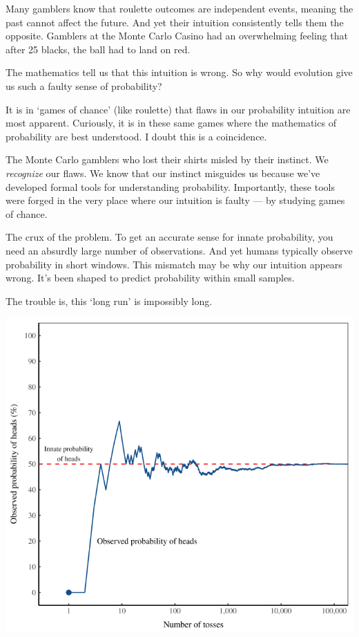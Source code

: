 \documentclass[
]{book}
\begin{document}
Many gamblers know that roulette outcomes are independent events, meaning the past cannot affect the future. And yet their intuition consistently tells them the opposite. Gamblers at the Monte Carlo Casino had an overwhelming feeling that after 25 blacks, the ball had to land on red.

The mathematics tell us that this intuition is wrong. So why would evolution give us such a faulty sense of probability?

It is in `games of chance' (like roulette) that flaws in our probability intuition are most apparent. Curiously, it is in these same games where the mathematics of probability are best understood. I doubt this is a coincidence.

The Monte Carlo gamblers who lost their shirts misled by their instinct.
We \emph{recognize} our flaws. We know that our instinct misguides us because we've developed formal tools for understanding probability. Importantly, these tools were forged in the very place where our intuition is faulty --- by studying games of chance.

The crux of the problem. To get an accurate sense for innate probability, you need an absurdly large number of observations. And yet humans typically observe probability in short windows. This mismatch may be why our intuition appears wrong. It's been shaped to predict probability within small samples.

The trouble is, this `long run' is impossibly long.

\includegraphics{fig/innate_probability.png}
\end{document}
